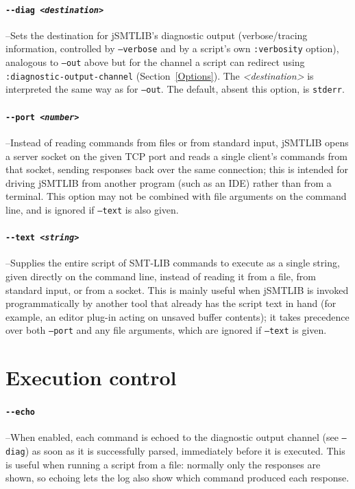 \documentclass[12pt,oneside]{report}
\begin{document}
\paragraph{\tt -{}-diag \it <destination>}\label{opt:diag} --Sets the destination for jSMTLIB's diagnostic output (verbose/tracing information, controlled by {\tt --verbose} and by a script's own {\tt :verbosity} option), analogous to {\tt --out} above but for the channel a script can redirect using {\tt :diagnostic-output-channel} (Section~\ref{Options}). The {\it <destination>} is interpreted the same way as for {\tt --out}. The default, absent this option, is {\tt stderr}.

\paragraph{\tt -{}-port \it <number>}\label{opt:port} --Instead of reading commands from files or from standard input, jSMTLIB opens a server socket on the given TCP port and reads a single client's commands from that socket, sending responses back over the same connection; this is intended for driving jSMTLIB from another program (such as an IDE) rather than from a terminal. This option may not be combined with file arguments on the command line, and is ignored if {\tt --text} is also given.

\paragraph{\tt -{}-text \it <string>}\label{opt:text} --Supplies the entire script of SMT-LIB commands to execute as a single string, given directly on the command line, instead of reading it from a file, from standard input, or from a socket. This is mainly useful when jSMTLIB is invoked programmatically by another tool that already has the script text in hand (for example, an editor plug-in acting on unsaved buffer contents); it takes precedence over both {\tt --port} and any file arguments, which are ignored if {\tt --text} is given.

\section{Execution control}

\paragraph{\tt -{}-echo}\label{opt:echo} --When enabled, each command is echoed to the diagnostic output channel (see {\tt --diag}) as soon as it is successfully parsed, immediately before it is executed. This is useful when running a script from a file: normally only the responses are shown, so echoing lets the log also show which command produced each response.
\end{document}
